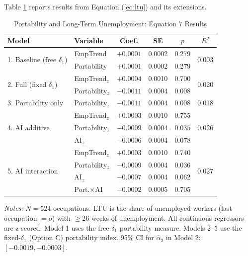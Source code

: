 \documentclass[12pt]{article}
\begin{document}
Table \ref{tab:ltu} reports results from Equation (\ref{eq:ltu}) and its extensions.

\begin{table}[H]
\centering
\caption{Portability and Long-Term Unemployment: Equation 7 Results}
\label{tab:ltu}
\begin{tabular}{llcccc}
\toprule
\textbf{Model} & \textbf{Variable} & \textbf{Coef.} & \textbf{SE} & \textbf{$p$} & \textbf{$R^2$} \\
\midrule
\multirow{2}{*}{1. Baseline (free $\delta_1$)} & EmpTrend & $+0.0001$ & 0.0002 & 0.279 & \multirow{2}{*}{0.003} \\
 & Portability & $+0.0001$ & 0.0002 & 0.279 & \\
\midrule
\multirow{2}{*}{2. Full (fixed $\delta_1$)} & EmpTrend$_z$ & $+0.0004$ & 0.0010 & 0.700 & \multirow{2}{*}{0.020} \\
 & Portability$_z$ & $\mathbf{-0.0011}$ & 0.0004 & $\mathbf{0.008}$ & \\
\midrule
3. Portability only & Portability$_z$ & $-0.0011$ & 0.0004 & 0.008 & 0.018 \\
\midrule
\multirow{3}{*}{4. AI additive} & EmpTrend$_z$ & $+0.0003$ & 0.0010 & 0.755 & \multirow{3}{*}{0.026} \\
 & Portability$_z$ & $\mathbf{-0.0009}$ & 0.0004 & $\mathbf{0.035}$ & \\
 & AI$_z$ & $-0.0006$ & 0.0004 & 0.078 & \\
\midrule
\multirow{4}{*}{5. AI interaction} & EmpTrend$_z$ & $+0.0003$ & 0.0010 & 0.740 & \multirow{4}{*}{0.027} \\
 & Portability$_z$ & $-0.0009$ & 0.0004 & 0.036 & \\
 & AI$_z$ & $-0.0007$ & 0.0004 & 0.062 & \\
 & Port.$\times$AI & $-0.0002$ & 0.0005 & 0.705 & \\
\bottomrule
\end{tabular}
\begin{minipage}{0.9\textwidth}
\vspace{0.5em}
\footnotesize \textit{Notes:} $N = 524$ occupations. LTU is the share of unemployed workers (last occupation $= o$) with $\geq$26 weeks of unemployment. All continuous regressors are z-scored. Model 1 uses the free-$\delta_1$ portability measure. Models 2--5 use the fixed-$\delta_1$ (Option C) portability index. 95\% CI for $\hat{\alpha}_2$ in Model 2: $[-0.0019, -0.0003]$.
\end{minipage}
\end{table}
\end{document}
